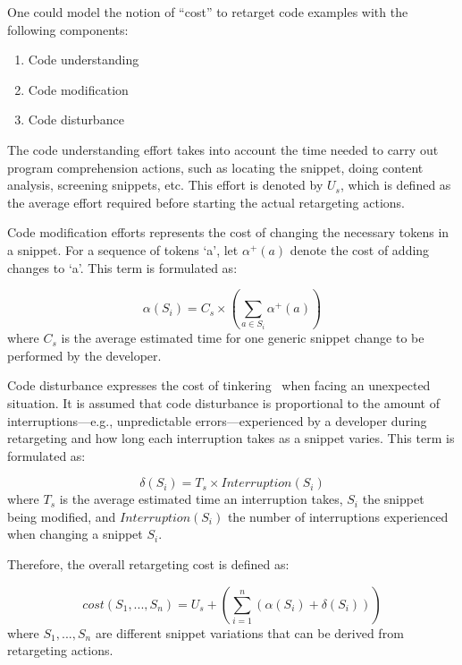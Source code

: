 One could model the notion of ``cost'' to retarget code examples with the following components:

\begin{enumerate}
	\item Code understanding
	\item Code modification
	\item Code disturbance
\end{enumerate}
 
The code understanding effort takes into account the time needed to carry out program comprehension actions, such as locating the snippet, doing content analysis, screening snippets, etc. This effort is denoted by $U_{s}$, which is defined as the average effort required before starting the actual retargeting actions.

Code modification efforts represents the cost of changing the necessary tokens in a snippet. For a sequence of tokens `a', let $\alpha^{+}(a)$ denote the cost of adding changes to `a'. This term is formulated as: 

\begin{equation}
	\alpha(S_{i}) = C_{s} \times (\sum_{a \in S_{i}}\alpha^{+}(a))
	\label{costmodification}
\end{equation} where $C_{s}$ is the average estimated time for one generic snippet change to be performed by the developer.

Code disturbance expresses the cost of tinkering~\cite{Jadud:2006ir} when facing an unexpected situation. It is assumed that code disturbance is proportional to the amount of interruptions---e.g., unpredictable errors---experienced by a developer during retargeting and how long each interruption takes as a snippet varies. This term is formulated as:

\begin{equation}
	\delta(S_{i}) = T_{s} \times Interruption(S_i)
	\label{costmodification}
\end{equation} where $T_{s}$ is the average estimated time an interruption takes, $S_i$ the snippet being modified, and $Interruption(S_i)$ the number of interruptions experienced when changing a snippet $S_i$. 

Therefore, the overall retargeting cost is defined as:

\begin{equation}
	cost(S_1, ..., S_n) = U_s + (\sum_{i=1}^{n}(\alpha(S_{i}) + \delta(S_{i})))
	\label{totalWork}
\end{equation} where $S_1, ..., S_n$ are different snippet variations that can be derived from retargeting actions.

